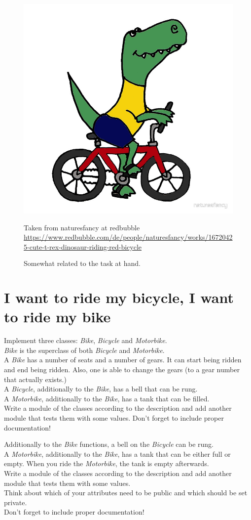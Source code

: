 \FloatBarrier
\begin{figure}[ht!]
	\centering
	\includegraphics[width=.8\textwidth]{dino_bike}
	\caption{Somewhat related to the task at hand.}
	Taken from naturesfancy at redbubble
	\url{https://www.redbubble.com/de/people/naturesfancy/works/16720425-cute-t-rex-dinosaur-riding-red-bicycle}
\end{figure}
\FloatBarrier

\section{I want to ride my bicycle, I want to ride my bike}
Implement three classes: \textit{Bike}, \textit{Bicycle} and \textit{Motorbike}.\\
\textit{Bike} is the superclass of both \textit{Bicycle} and \textit{Motorbike}.\\
A \textit{Bike} has a number of seats and a number of gears. It can start being ridden and
end being ridden. Also, one is able to change the gears (to a gear number that
actually exists.)\\
A \textit{Bicycle}, additionally to the \textit{Bike}, has a bell that can be rung.\\
A \textit{Motorbike}, additionally to the \textit{Bike}, has a tank that can be filled.\\
Write a module of the classes according to the description and add another module
that tests them with some values. Don't forget to include proper documentation!

Additionally to the \textit{Bike} functions, a bell on the \textit{Bicycle} can be rung.\\
A \textit{Motorbike}, additionally to the \textit{Bike}, has a tank that can be
either full or empty. When you ride the \textit{Motorbike}, the tank is empty afterwards.\\
Write a module of the classes according to the description and add another module
that tests them with some values.\\
Think about which of your attributes need to be public and which should be set private.\\
Don't forget to include proper documentation!

